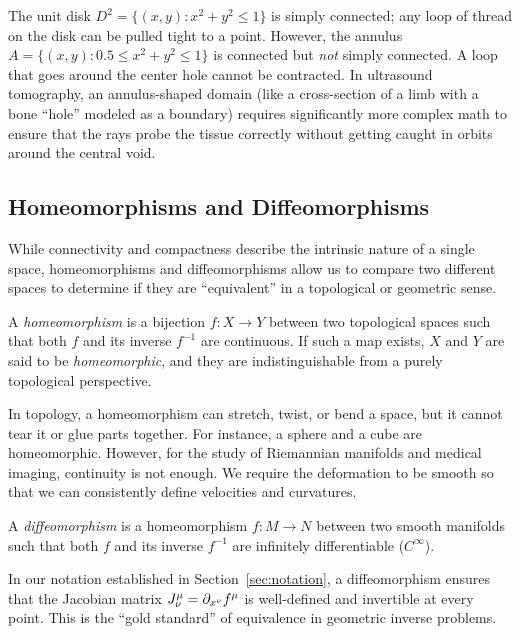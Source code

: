 \begin{example}
  The unit disk $D^2 = \{(x, y) : x^2 + y^2 \leq 1\}$ is simply connected; any loop of thread on the disk can be pulled tight to a point. However, the annulus $A = \{(x, y) : 0.5 \leq x^2 + y^2 \leq 1\}$ is connected but \emph{not} simply connected. A loop that goes around the center hole cannot be contracted. In ultrasound tomography, an annulus-shaped domain (like a cross-section of a limb with a bone ``hole'' modeled as a boundary) requires significantly more complex math to ensure that the rays probe the tissue correctly without getting caught in orbits around the central void.
\end{example}

\subsection{Homeomorphisms and Diffeomorphisms} While connectivity and compactness describe the intrinsic nature of a single space, homeomorphisms and diffeomorphisms allow us to compare two different spaces to determine if they are ``equivalent'' in a topological or geometric sense.

\begin{definition}
  A \emph{homeomorphism} is a bijection $f: X \to Y$ between two topological spaces such that both $f$ and its inverse $f^{-1}$ are continuous. If such a map exists, $X$ and $Y$ are said to be \emph{homeomorphic}, and they are indistinguishable from a purely topological perspective.
\end{definition}

In topology, a homeomorphism can stretch, twist, or bend a space, but it cannot tear it or glue parts together. For instance, a sphere and a cube are homeomorphic. However, for the study of Riemannian manifolds and medical imaging, continuity is not enough. We require the deformation to be smooth so that we can consistently define velocities and curvatures.

\begin{definition}
  A \emph{diffeomorphism} is a homeomorphism $f: M \to N$ between two smooth manifolds such that both $f$ and its inverse $f^{-1}$ are infinitely differentiable ($C^\infty$).
\end{definition}

In our notation established in Section~\ref{sec:notation}, a diffeomorphism ensures that the Jacobian matrix $J^\mu_\nu = \pd{x^\nu} f^\mu$ is well-defined and invertible at every point. This is the ``gold standard'' of equivalence in geometric inverse problems.

